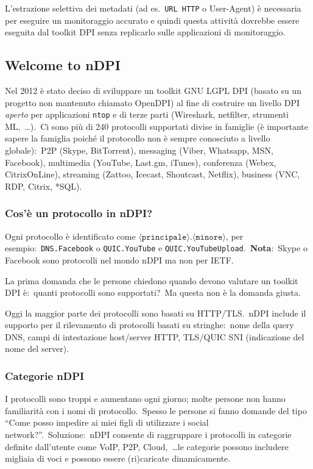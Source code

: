 L'estrazione selettiva dei metadati (ad es.\ \texttt{URL HTTP} o User-Agent) è necessaria per eseguire un monitoraggio accurato e quindi questa attività dovrebbe essere eseguita dal toolkit DPI senza replicarlo sulle applicazioni di monitoraggio.\

\subsection{Welcome to nDPI}

Nel 2012 è stato deciso di sviluppare un toolkit GNU LGPL DPI (basato su un progetto non mantenuto chiamato OpenDPI) al fine di costruire un livello DPI \textit{aperto} per applicazioni \texttt{ntop} e di terze parti (Wireshark, netfilter, strumenti ML,\ \dots).\
Ci sono più di 240 protocolli supportati divise in famiglie (è importante sapere la famiglia poiché il protocollo non è sempre conosciuto a livello globale):\ P2P (Skype, BitTorrent), messaging (Viber, Whatsapp, MSN, Facebook), multimedia (YouTube, Last.gm, iTunes), conferenza (Webex, CitrixOnLine), streaming (Zattoo, Icecast, Shoutcast, Netflix), business (VNC, RDP, Citrix, *SQL).

\subsubsection{Cos'è un protocollo in nDPI?}

Ogni protocollo è identificato come $\langle \mathtt{principale} \rangle . \langle \mathtt{minore} \rangle$, per esempio:\ \texttt{DNS.Facebook} o \texttt{QUIC.YouTube} e \texttt{QUIC.YouTubeUpload}.\
\textbf{Nota}:\ Skype o Facebook sono protocolli nel mondo nDPI ma non per IETF.\

La prima domanda che le persone chiedono quando devono valutare un toolkit DPI è:\ quanti protocolli sono supportati?\ Ma questa non è la domanda giusta.

Oggi la maggior parte dei protocolli sono basati su HTTP/TLS.\
nDPI include il supporto per il rilevamento di protocolli basati su stringhe:\ nome della query DNS, campi di intestazione host/server HTTP, TLS/QUIC SNI (indicazione del nome del server).

\subsubsection{Categorie nDPI}

I protocolli sono troppi e aumentano ogni giorno; molte persone non hanno familiarità con i nomi di protocollo.\
Spesso le persone si fanno domande del tipo ``Come posso impedire ai miei figli di utilizzare i social network?''.\
Soluzione:\
nDPI consente di raggruppare i protocolli in categorie definite dall'utente come VoIP, P2P, Cloud,\ \dots le categorie possono includere migliaia di voci e possono essere (ri)caricate dinamicamente.\

